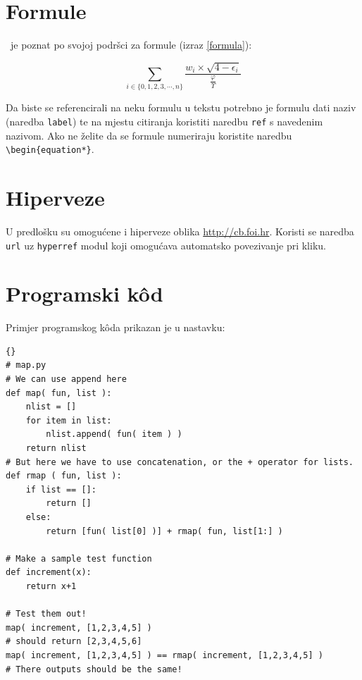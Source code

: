 \documentclass[a4paper,12pt]{foi}
\begin{document}
\chapter{Formule}

\LaTeXe\ je poznat po svojoj podr\v{s}ci za formule (izraz \ref{formula}):

\begin{equation}
 \label{formula}
 \displaystyle\sum_{i \in \{ 0, 1, 2, 3, \cdots, n\}}{\frac{w_i \times \sqrt{4 - \epsilon_i}}{\frac{\varphi}{\Upsilon}}}
\end{equation} 

Da biste se referencirali na neku formulu u tekstu potrebno je formulu dati naziv (naredba \texttt{label}) te na mjestu citiranja koristiti naredbu \texttt{ref} s navedenim nazivom. Ako ne želite da se formule numeriraju koristite naredbu \texttt{\textbackslash begin\{equation*\}}.

\chapter{Hiperveze}

U predlo\v{s}ku su omogu\'{c}ene i hiperveze oblika \url{http://cb.foi.hr}. Koristi se naredba \texttt{url} uz \texttt{hyperref} modul koji omogućava automatsko povezivanje pri kliku.

\chapter{Programski k\^{o}d}

Primjer programskog k\^{o}da prikazan je u nastavku:

\lstset{commentstyle=\textit,language=python}
\begin{lstlisting}[frame=tb]{}
# map.py
# We can use append here
def map( fun, list ):
    nlist = []
    for item in list:
        nlist.append( fun( item ) )
    return nlist
# But here we have to use concatenation, or the + operator for lists.
def rmap ( fun, list ):
    if list == []:
        return []
    else:
        return [fun( list[0] )] + rmap( fun, list[1:] )

# Make a sample test function
def increment(x):
    return x+1

# Test them out!
map( increment, [1,2,3,4,5] )
# should return [2,3,4,5,6]
map( increment, [1,2,3,4,5] ) == rmap( increment, [1,2,3,4,5] )
# There outputs should be the same!

\end{lstlisting}
\end{document}
